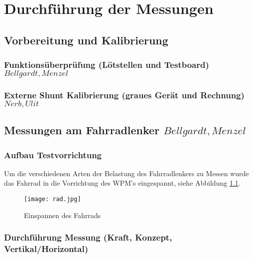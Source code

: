 \chapter{Durchf\"uhrung der Messungen}

\section{Vorbereitung und Kalibrierung}
\subsection{Funktions\"uberpr\"ufung (L\"otstellen und Testboard) \(Bellgardt, Menzel\)}


\subsection{Externe Shunt Kalibrierung (graues Ger\"at und Rechnung) \(Nerb, Ulit\)}

\section{Messungen am Fahrradlenker \(Bellgardt, Menzel\)}
\subsection{Aufbau Testvorrichtung}
Um die verschiedenen Arten der Belastung des Fahrradlenkers zu Messen wurde das Fahrrad in die Vorrichtung des WPM's eingespannt, siehe Abbildung \ref{fig:rad}.
\begin{figure}[htbp]
    \begin{center}
        \texttt{[image: rad.jpg]}
        \caption[Einspannen des Fahrrads (Abbildungsverzeichnis)]{Einspannen des Fahrrads}
        
        \label{fig:rad}
    \end{center}
\end{figure}

\subsection{Durchf\"uhrung Messung (Kraft, Konzept, Vertikal/Horizontal)}

